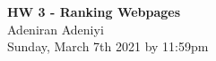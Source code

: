 \documentclass[12pt]{article}
\begin{document}
\begin{centering}
{\large\textbf{HW 3 - Ranking Webpages}}\\ %
Adeniran Adeniyi\\                     %
Sunday, March 7th 2021 by 11:59pm\\                      %
\end{centering}


\end{document}
